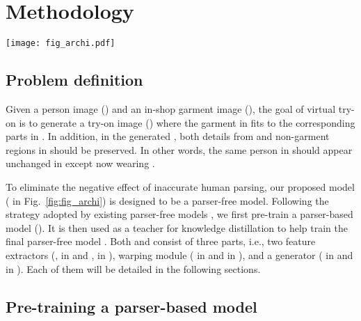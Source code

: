 \documentclass[10pt,twocolumn,letterpaper]{article}
\begin{document}
\section{Methodology}
\begin{figure*}[t!]
    \centering
    \texttt{[image: fig\_archi.pdf]}
    \caption{A schematic of our framework. The pre-trained parser based model  generates an output image as the input of parser free model . The two feature extractors in  extract the feature of person image and garment image, respectively. A style vector is extracted from the lowest resolution feature maps from person image and the garment image. The warping module takes in the style vector and feature maps from the person image and garment image, and output an appearance flow map. The appearance flow is then used to warp the garment. Finally, the warped garment is concatenated with person image and fed into the generator to generate the target try-on image. Note that  is only used during training.}
    \vspace{-0.4cm}
    \label{fig:fig_archi}
\end{figure*}

\subsection{Problem definition}

Given a person image () and an in-shop garment image (), the goal of virtual try-on is to generate a try-on image () where the garment in  fits to the corresponding parts in . In addition, in the generated , both details from  and non-garment regions in  should be preserved. In other words, the same person in  should appear unchanged in  except now wearing .

To eliminate the negative effect of inaccurate human parsing, our proposed model ( in Fig.~\ref{fig:fig_archi}) is designed to be a parser-free model. Following the strategy adopted by existing parser-free models \cite{issenhuth2020not, ge2021parser}, we first pre-train a parser-based model (). It is then used as a teacher for knowledge distillation to help train the final parser-free model . Both  and  consist of three parts, i.e., two feature extractors (,  in  and ,  in ), warping module ( in  and  in ), and a generator ( in  and  in ). Each of them will be detailed in the following sections.

\subsection{Pre-training a parser-based model}
\end{document}
